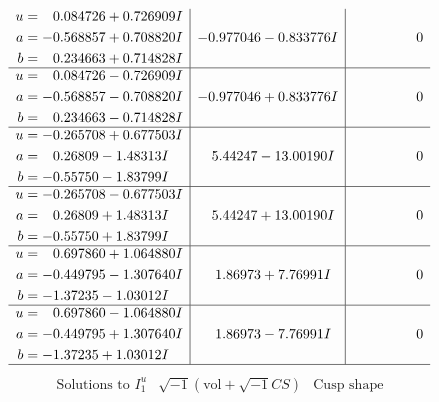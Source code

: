 \documentclass[1p]{elsarticle_modified}
\theoremstyle{definition}
\newcommand{\I}{\sqrt{-1}}
\begin{document}
$$\begin{array}{c|c|c}
\begin{aligned}
u &= \phantom{-}0.084726 + 0.726909 I \\
a &= -0.568857 + 0.708820 I \\
b &= \phantom{-}0.234663 + 0.714828 I\end{aligned}
 & -0.977046 - 0.833776 I & \phantom{-0.000000 } 0 \\ \hline\begin{aligned}
u &= \phantom{-}0.084726 - 0.726909 I \\
a &= -0.568857 - 0.708820 I \\
b &= \phantom{-}0.234663 - 0.714828 I\end{aligned}
 & -0.977046 + 0.833776 I & \phantom{-0.000000 } 0 \\ \hline\begin{aligned}
u &= -0.265708 + 0.677503 I \\
a &= \phantom{-}0.26809 - 1.48313 I \\
b &= -0.55750 - 1.83799 I\end{aligned}
 & \phantom{-}5.44247 - 13.00190 I & \phantom{-0.000000 } 0 \\ \hline\begin{aligned}
u &= -0.265708 - 0.677503 I \\
a &= \phantom{-}0.26809 + 1.48313 I \\
b &= -0.55750 + 1.83799 I\end{aligned}
 & \phantom{-}5.44247 + 13.00190 I & \phantom{-0.000000 } 0 \\ \hline\begin{aligned}
u &= \phantom{-}0.697860 + 1.064880 I \\
a &= -0.449795 - 1.307640 I \\
b &= -1.37235 - 1.03012 I\end{aligned}
 & \phantom{-}1.86973 + 7.76991 I & \phantom{-0.000000 } 0 \\ \hline\begin{aligned}
u &= \phantom{-}0.697860 - 1.064880 I \\
a &= -0.449795 + 1.307640 I \\
b &= -1.37235 + 1.03012 I\end{aligned}
 & \phantom{-}1.86973 - 7.76991 I & \phantom{-0.000000 } 0\\
 \hline 
 \end{array}$$\newpage$$\begin{array}{c|c|c}  
\text{Solutions to }I^u_{1}& \I (\text{vol} + \sqrt{-1}CS) & \text{Cusp shape}\\
 \hline 
\begin{aligned}

\end{aligned}
\end{array}$$
\end{document}

